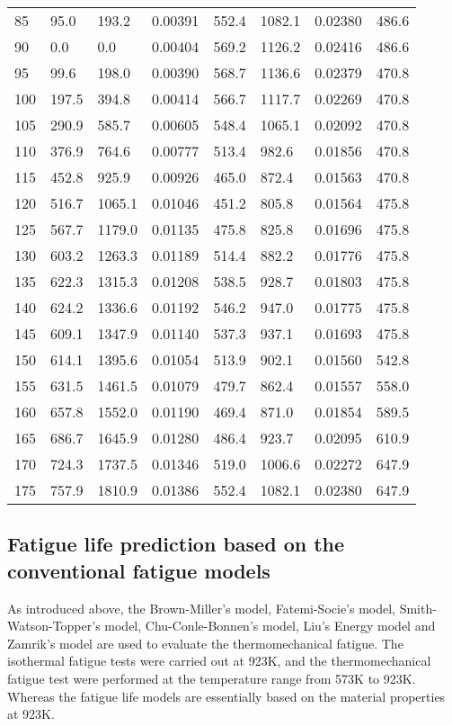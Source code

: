 \begin{table}[htbp]
\begin{tabular}{p{1.5cm}p{1.5cm}p{1.5cm}p{1.5cm}p{1.5cm}p{1.5cm}p{1.5cm}p{1.5cm}}
    85    & 95.0  & 193.2  & 0.00391  & 552.4  & 1082.1  & 0.02380  & 486.6  \\
    90    & 0.0   & 0.0   & 0.00404  & 569.2  & 1126.2  & 0.02416  & 486.6  \\
    95    & 99.6  & 198.0  & 0.00390  & 568.7  & 1136.6  & 0.02379  & 470.8  \\
    100   & 197.5  & 394.8  & 0.00414  & 566.7  & 1117.7  & 0.02269  & 470.8  \\
    105   & 290.9  & 585.7  & 0.00605  & 548.4  & 1065.1  & 0.02092  & 470.8  \\
    110   & 376.9  & 764.6  & 0.00777  & 513.4  & 982.6  & 0.01856  & 470.8  \\
    115   & 452.8  & 925.9  & 0.00926  & 465.0  & 872.4  & 0.01563  & 470.8  \\
    120   & 516.7  & 1065.1  & 0.01046  & 451.2  & 805.8  & 0.01564  & 475.8  \\
    125   & 567.7  & 1179.0  & 0.01135  & 475.8  & 825.8  & 0.01696  & 475.8  \\
    130   & 603.2  & 1263.3  & 0.01189  & 514.4  & 882.2  & 0.01776  & 475.8  \\
    135   & 622.3  & 1315.3  & 0.01208  & 538.5  & 928.7  & 0.01803  & 475.8  \\
    140   & 624.2  & 1336.6  & 0.01192  & 546.2  & 947.0  & 0.01775  & 475.8  \\
    145   & 609.1  & 1347.9  & 0.01140  & 537.3  & 937.1  & 0.01693  & 475.8  \\
    150   & 614.1  & 1395.6  & 0.01054  & 513.9  & 902.1  & 0.01560  & 542.8  \\
    155   & 631.5  & 1461.5  & 0.01079  & 479.7  & 862.4  & 0.01557  & 558.0  \\
    160   & 657.8  & 1552.0  & 0.01190  & 469.4  & 871.0  & 0.01854  & 589.5  \\
    165   & 686.7  & 1645.9  & 0.01280  & 486.4  & 923.7  & 0.02095  & 610.9  \\
    170   & 724.3  & 1737.5  & 0.01346  & 519.0  & 1006.6  & 0.02272  & 647.9  \\
    175   & 757.9  & 1810.9  & 0.01386  & 552.4  & 1082.1  & 0.02380  & 647.9  \\
    \bottomrule
    \end{tabular}%
  \label{Tab:stress_on_material_plane}%
\end{table}%

\subsection{Fatigue life prediction based on the conventional fatigue models}
\noindent
As introduced above, the Brown-Miller's model, Fatemi-Socie's model, Smith-Watson-Topper's model, Chu-Conle-Bonnen's model, Liu's Energy model and Zamrik's model are used to evaluate the thermomechanical fatigue. The isothermal fatigue tests were carried out at 923K, and the thermomechanical fatigue test were performed at the temperature range from 573K to 923K.
Whereas the fatigue life models are essentially based on the material properties at 923K.

